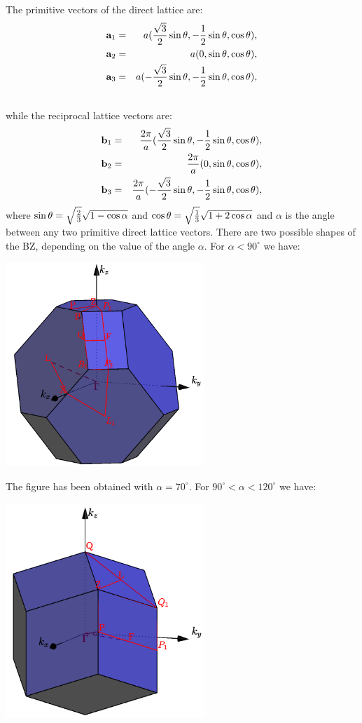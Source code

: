 \documentclass[12pt,a4paper]{article}
\begin{document}
The primitive vectors of the direct lattice are:
\begin{eqnarray}
{\bf a}_1 &=& a ({\sqrt{3}\over 2}\sin{\theta}, -{1\over 2} \sin{\theta},
          \cos{\theta}), 
\nonumber \\
{\bf a}_2 &=& a (0, \sin{\theta}, \cos{\theta}), 
\nonumber \\
{\bf a}_3 &=& a (-{\sqrt{3}\over 2} \sin{\theta}, -{1\over 2} \sin{\theta},
         \cos{\theta}), 
\nonumber \\
\nonumber
\end{eqnarray}
while the reciprocal lattice vectors are:
\begin{eqnarray}
{\bf b}_1 &=& {2\pi \over a} ({\sqrt{3}\over 2} \sin{\theta}, 
-{1 \over 2} \sin{\theta}, \cos{\theta}), \nonumber \\
{\bf b}_2 &=& {2\pi \over a} (0, 
\sin{\theta}, \cos{\theta}), \nonumber \\
{\bf b}_3 &=& {2\pi \over a} (-{\sqrt{3}\over 2} \sin{\theta}, 
-{1 \over 2} \sin{\theta}, \cos{\theta}), \nonumber 
\end{eqnarray}
where $\sin{\theta}=\sqrt{2\over 3}\sqrt{1-\cos{\alpha}}$
and $\cos{\theta}=\sqrt{1\over 3}\sqrt{1 + 2 \cos{\alpha}}$ and $\alpha$
is the angle between any two primitive direct lattice vectors.
There are two possible shapes of the BZ, depending on the
value of the angle $\alpha$. For $\alpha < 90^\circ$ we
have:
\begin{center}
\includegraphics[width=7.5cm,angle=0]{images/tri_1.png}
\end{center}
The figure has been obtained with $\alpha=70^\circ$.
For $90^\circ < \alpha < 120^\circ$ we have:
\begin{center}
\includegraphics[width=7.5cm,angle=0]{images/tri_2.png}
\end{center}
\end{document}
